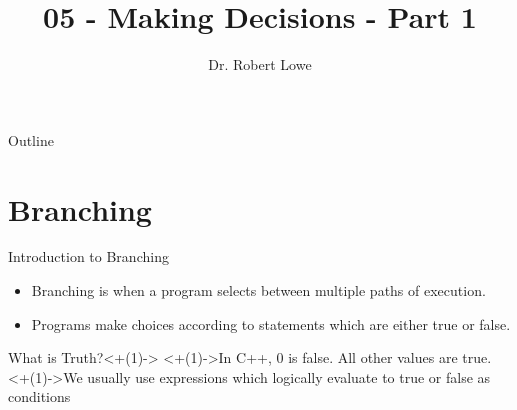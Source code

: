 \documentclass[]{beamer}
\title{05 - Making Decisions - Part 1}
\author{Dr. Robert Lowe\\}
\institute[Maryville College] %
{
  Division of Mathematics and Computer Science\\
  Maryville College
}
\date[]{}
\begin{document}
\begin{frame}
  \titlepage
\end{frame}

\begin{frame}{Outline}
  \tableofcontents
\end{frame}





\section{Branching}

\begin{frame}{Introduction to Branching}
    \begin{itemize}[<+(1)->]
        \item Branching is when a program selects between multiple
            paths of execution.
        \item Programs make choices according to statements which are
            either true or false.
    \end{itemize}

    \begin{block}{What is Truth?}<+(1)->
        \uncover<+(1)->{In C++, 0 is false.  All other values are true.}
        \newline\uncover<+(1)->{We usually use expressions which
            logically evaluate to true or false as conditions}
    \end{block}
\end{frame}
\end{document}
